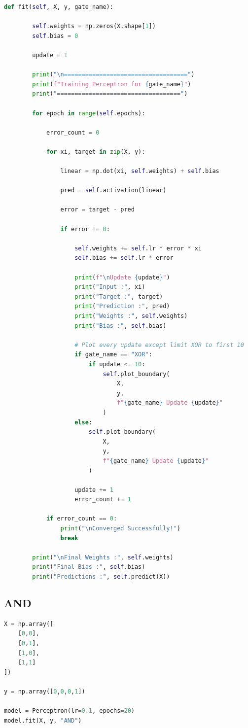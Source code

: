 \documentclass[11pt]{article}
\begin{document}
\begin{lstlisting}[language=Python]
    def fit(self, X, y, gate_name):

        self.weights = np.zeros(X.shape[1])
        self.bias = 0

        update = 1

        print("\n===================================")
        print(f"Training Perceptron for {gate_name}")
        print("===================================")

        for epoch in range(self.epochs):

            error_count = 0

            for xi, target in zip(X, y):

                linear = np.dot(xi, self.weights) + self.bias

                pred = self.activation(linear)

                error = target - pred

                if error != 0:

                    self.weights += self.lr * error * xi
                    self.bias += self.lr * error

                    print(f"\nUpdate {update}")
                    print("Input :", xi)
                    print("Target :", target)
                    print("Prediction :", pred)
                    print("Weights :", self.weights)
                    print("Bias :", self.bias)

                    # Plot every update except limit XOR to first 10
                    if gate_name == "XOR":
                        if update <= 10:
                            self.plot_boundary(
                                X,
                                y,
                                f"{gate_name} Update {update}"
                            )
                    else:
                        self.plot_boundary(
                            X,
                            y,
                            f"{gate_name} Update {update}"
                        )

                    update += 1
                    error_count += 1

            if error_count == 0:
                print("\nConverged Successfully!")
                break

        print("\nFinal Weights :", self.weights)
        print("Final Bias :", self.bias)
        print("Predictions :", self.predict(X))
\end{lstlisting}
\subsection{AND}
\begin{lstlisting}[language=Python]
X = np.array([
    [0,0],
    [0,1],
    [1,0],
    [1,1]
])

y = np.array([0,0,0,1])

model = Perceptron(lr=0.1, epochs=20)
model.fit(X, y, "AND")
\end{lstlisting}
\end{document}
